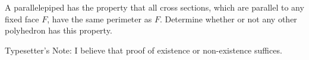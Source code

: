 A parallelepiped has the property that all cross sections, which are parallel to any fixed face $F$,  have the same perimeter as $F$. Determine whether or not any other polyhedron has this property.

Typesetter's Note: I believe that proof of existence or non-existence suffices.